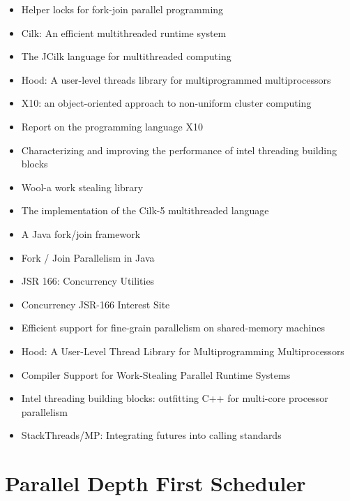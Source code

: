 \begin{itemize}
\item Helper locks for fork-join parallel programming
  \cite{Agrawal2010}
\item[\checkmark] Cilk: An efficient multithreaded runtime system
  \cite{Blumofe1995}
\item[\checkmark] The JCilk language for multithreaded computing
  \cite{Danaher2005}
\item Hood: A user-level threads library for multiprogrammed
  multiprocessors \cite{Blumofe1998}
\item X10: an object-oriented approach to non-uniform cluster
  computing \cite{Charles2005}
\item Report on the programming language X10 \cite{Saraswat2010}
\item[\checkmark] Characterizing and improving the performance of
  intel threading building blocks \cite{Contreras2008}
\item[\texttimes] Wool-a work stealing library \cite{Faxen2009}
\item[\checkmark] The implementation of the Cilk-5 multithreaded
  language \cite{Frigo1998}
\item[\checkmark] A Java fork/join framework \cite{Lea2000}
\item[\checkmark] Fork / Join Parallelism in Java \cite{Lea2000a}
\item[\checkmark] JSR 166: Concurrency Utilities \cite{Lea2004}
\item[\checkmark] Concurrency JSR-166 Interest Site \cite{Lea2006}
\item Efficient support for fine-grain parallelism on shared-memory
  machines \cite{Lowenthal1998}
\item Hood: A User-Level Thread Library for Multiprogramming
  Multiprocessors \cite{Papadopoulos1998}
\item Compiler Support for Work-Stealing Parallel Runtime Systems
  \cite{Raman2009}
\item[\checkmark] Intel threading building blocks: outfitting C++ for
  multi-core processor parallelism \cite{Reinders2007}
\item StackThreads/MP: Integrating futures into calling standards
  \cite{Taura1999}
\end{itemize}


\section*{Parallel Depth First Scheduler}
\label{sec:lr-parallel-depth-first-scheduler}

